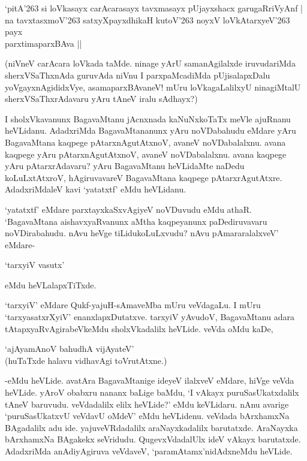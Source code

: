 \begin{shloka}
`pitA\char'263 si loVkasayx carAcarasayx tavxmasayx pUjayxshacx garugaRriVyAnf |\\
na tavxtasxmoV\char'263 satxyXpayxdhikaH kutoV\char'263 noyxV loVkAtarxyeV\char'263 payx\\
\hspace{5.3cm} parxtimaparxBAva ||
\end{shloka}

(niVneV carAcara loVkada taMde. ninage yArU samanAgilalxde iruvudariMda sherxVSaThxnAda guruvAda niVnu I parxpaMcadiMda pUjisalapxDalu yoVgayxnAgididxVye, asamaparxBAvaneV! mUru loVkagaLalilxyU ninagiMtalU sherxVSaThxrAdavaru yAru tAneV iralu sAdhayx?)

I sholxVkavanunx BagavaMtanu jAcnxnada kaNuNxkoTaTx meVle ajuRnanu heVLidanu. AdadxriMda BagavaMtananunx yAru noVDabahudu eMdare yAru BagavaMtana kaqpege pAtarxnAgutAtxnoV, avaneV noVDabalalxnu. avana kaqpege yAru pAtarxnAgutAtxnoV, avaneV noVDabalalxnu. avana kaqpege yAru pAtarxrAdavaru? yAru BagavaMtanu heVLidaMte naDedu koLuLxtAtxroV, hAgiruvavareV BagavaMtana kaqpege pAtarxrAgutAtxre. AdadxriMdaleV kavi `yatatxtf' eMdu heVLidanu.

`yatatxtf' eMdare parxtayxkaSxvAgiyeV noVDuvudu eMdu athaR. `BagavaMtana aishavxyaRvanunx aMtha kaqpeyanunx paDediruvavaru noVDirabahudu. nAvu heVge tiLidukoLuLxvudu? nAvu pAmararalalxveV' eMdare-

\begin{shloka}
`tarxyiV vasutx'
\end{shloka}

eMdu heVLalapxTiTxde.

`tarxyiV' eMdare Qukf-yajuH-sAmaveMba mUru veVdagaLu. I mUru `tarxyasatxrXyiV' enanxlapxDutatxve. tarxyiV yAvudoV, BagavaMtanu adara tAtapxyaRvAgirabeVkeMdu sholxVkadalilx heVLide. veVda oMdu kaDe,

\begin{shloka}
`ajAyamAnoV bahudhA vijAyateV'\\
(huTaTxde halavu vidhavAgi toVrutAtxne.)
\end{shloka}

-eMdu heVLide. avatAra BagavaMtanige ideyeV ilalxveV eMdare, hiVge veVda heVLide. yAroV obabxru nananx baLige baMdu, `I vAkayx puruSasUkatxdalilx tAneV baruvudu. veVdadalilx elilx heVLide?' eMdu keVLidaru. nAnu avarige `puruSasUkatxvU veVdavU oMdeV' eMdu heVLidenu. veVdada bArxhamxNa BAgadalilx adu ide. yajuveVRdadalilx araNayxkadalilx barutatxde. AraNayxka bArxhamxNa BAgakekx seVridudu. QugevxVdadalUlx ideV vAkayx barutatxde. AdadxriMda anAdiyAgiruva veVdaveV, `paramAtamx'nidAdxneMdu heVLide.

